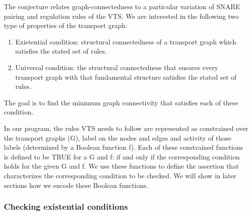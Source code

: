 The conjecture relates graph-connectedness to a particular variation of SNARE pairing and regulation rules of the VTS.
%
We are interested in the following two type of properties of the transport graph:

\begin{enumerate}
\item Existential condition:
structural connectedness of a transport graph which satisfies the stated set of rules. 



\item Universal condition: 
the structural connectedness that ensures every transport graph with that fundamental structure satisfies the stated set of rules. 
\end{enumerate}

The goal is to find the minimum graph connectivity that satisfies each of these condition.


In our program, the rules VTS needs to follow 
%
%
are represented as constrained over the transport graphs (G), label on the nodes and edges and activity of those labels (determined by a Boolean function f). 
%
Each of these constrained functions is defined to be TRUE for a G and f: if and only if the corresponding condition holds for the given G and f. 
%
We use these functions to define the assertion that characterizes the corresponding condition to be checked. 
%
We will show in later sections how we encode these Boolean functions. 

\subsubsection{Checking existential conditions} 

